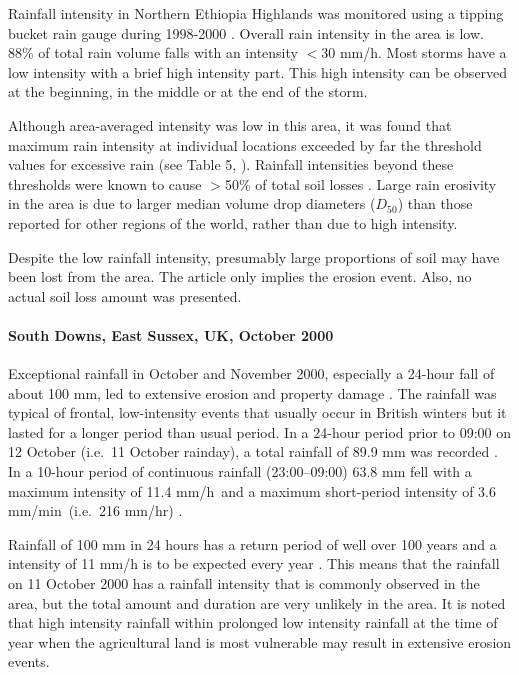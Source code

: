 Rainfall intensity in Northern Ethiopia Highlands was monitored using a tipping
bucket rain gauge during 1998-2000 \citep{nyssen2005-172}. Overall rain
intensity in the area is low. 88\% of total rain volume falls with an intensity
$<$30 mm/h. Most storms have a low intensity with a brief high intensity part.
This high intensity can be observed at the beginning, in the middle or at the
end of the storm.

Although area-averaged intensity was low in this area, it was found that maximum
rain intensity at individual locations exceeded by far the threshold values for
excessive rain (see Table 5, \citealp{nyssen2005-172}). Rainfall intensities
beyond these thresholds were known to cause $>$50\% of total soil losses
\citep{krauer1988-rainfallerosivityand}. Large rain erosivity in the area is due
to larger median volume drop diameters ($D_{50}$) than those reported for other
regions of the world, rather than due to high intensity.

Despite the low rainfall intensity, presumably large proportions of soil may
have been lost from the area. The article only implies the erosion event. Also,
no actual soil loss amount was presented.

\paragraph{South Downs, East Sussex, UK, October 2000
\citep{boardman2001-346}}
\label{sec:SouthDownsOctober2000}

Exceptional rainfall in October and November 2000, especially a 24-hour fall of
about 100 mm, led to extensive erosion and property damage
\citep{boardman2001-346}. The rainfall was typical of frontal, low-intensity
events that usually occur in British winters but it lasted for a longer period
than usual period. In a 24-hour period prior to 09:00 on 12 October (i.e.\ 11
October rainday), a total rainfall of 89.9 mm was recorded
\citep{boardman2001-346}.
In a 10-hour period of continuous rainfall (23:00--09:00) 63.8 mm fell with a
maximum intensity of 11.4 mm/h\ and a maximum short-period intensity of 3.6
mm/min\ (i.e.\ 216 mm/hr) \citep{boardman2001-346}.

Rainfall of 100 mm in 24 hours has a return period of well over 100 years and a
intensity of 11 mm/h is to be expected every year \citep{boardman2001-346}. This
means that the rainfall on 11 October 2000 has a rainfall intensity that is
commonly observed in the area, but the total amount and duration are very
unlikely in the area. It is noted that high intensity rainfall within prolonged
low intensity rainfall at the time of year when the agricultural land is most
vulnerable may result in extensive erosion events.

